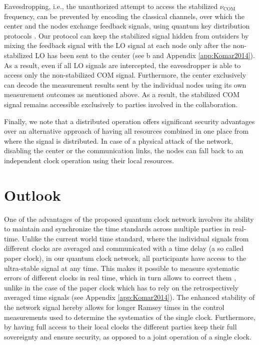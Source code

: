 Eavesdropping, i.e., the unauthorized attempt to access the stabilized
$\nu_\mathrm{COM}$ frequency, can be prevented by encoding the classical channels,
over which the center and the nodes exchange feedback signals, using quantum key
distribution protocols \cite{Gisin2002}. Our protocol can keep the stabilized
signal hidden from outsiders by mixing the feedback signal with the LO signal at each node only
after the non-stabilized LO has been sent to the center (see
b and Appendix \ref{app:Komar2014}). As a result, even if  all LO signals are intercepted, the eavesdropper is able to access
only the non-stabilized COM signal. Furthermore, the center exclusively can decode the
measurement results sent by the individual nodes using its own measurement outcomes as mentioned above. 
As a result, the stabilized COM signal remains
accessible exclusively to parties involved in the collaboration.

Finally, we note that a distributed operation offers significant security
advantages over an alternative approach of having all resources combined in one
place from where the signal is distributed. In case of a physical attack of the
network, disabling the center or the communication links, the nodes can fall
back to an independent clock operation using their local resources.

\section{Outlook}

One of the advantages of the proposed quantum clock network involves its ability
to maintain and synchronize the time standards across multiple parties in
real-time. 
Unlike the current world time standard, where the individual signals from
different clocks are averaged and communicated with a time delay (a so called
paper clock), in our quantum clock network, all participants have access to the
ultra-stable signal at any time.
This makes it possible to measure systematic errors of different clocks in
real time, which in turn allows to correct them \cite{Bloom2013}, unlike in the
case of the paper clock which has to rely on the retrospectively averaged time 
signals (see Appendix \ref{app:Komar2014}). 
The enhanced stability of the network signal hereby allows for longer Ramsey
times in the control measurements used to determine the systematics of the
single clock.
Furthermore, by having full access to their local clocks the different parties
keep  their full sovereignty and ensure security, as opposed to a joint
operation of a single clock.

